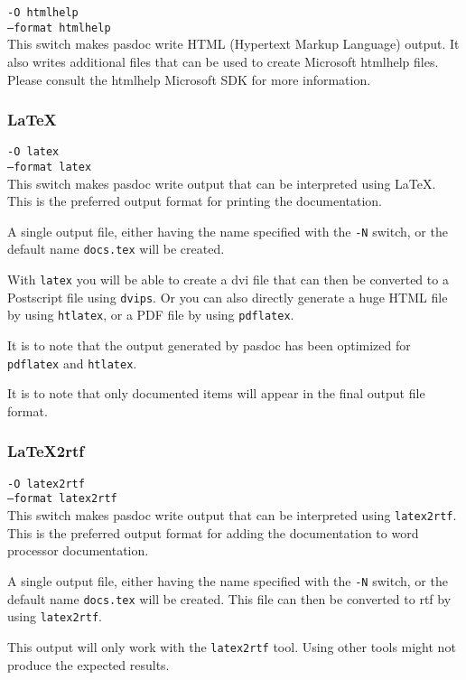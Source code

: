 \documentclass[11pt]{article}
\begin{document}
{\tt -O htmlhelp}\\
{\tt --format htmlhelp}\\

This switch makes pasdoc write HTML (Hypertext Markup Language) output.
It also writes additional files that can be used to create Microsoft
htmlhelp files. Please consult the htmlhelp Microsoft SDK for more 
information.

\subsubsection{\LaTeX}

{\tt -O latex}\\
{\tt --format latex}\\

This switch makes pasdoc write output that can be interpreted using
\LaTeX. This is the preferred output format for printing the 
documentation.

A single output file, either having the name specified with
the {\tt -N} switch, or the default name {\tt docs.tex} will
be created. 

With {\tt latex} you will be able to create a dvi file
that can then be converted to a Postscript file using 
{\tt dvips}. Or you can also directly generate a huge
HTML file by using {\tt htlatex}, or a PDF file
by using {\tt pdflatex}.

It is to note that the output generated by pasdoc has been 
optimized for {\tt pdflatex} and {\tt htlatex}.

It is to note that only documented items will appear in the final
output file format.


\subsubsection{LaTeX2rtf}

{\tt -O latex2rtf}\\
{\tt --format latex2rtf}\\

This switch makes pasdoc write output that can be interpreted using
{\tt latex2rtf}. This is the preferred output format for adding
the documentation to word processor documentation.

A single output file, either having the name specified with
the {\tt -N} switch, or the default name {\tt docs.tex} will
be created. This file can then be converted to rtf by using
{\tt latex2rtf}.

This output will only work with the {\tt latex2rtf} tool. Using
other tools might not produce the expected results. 
\end{document}
